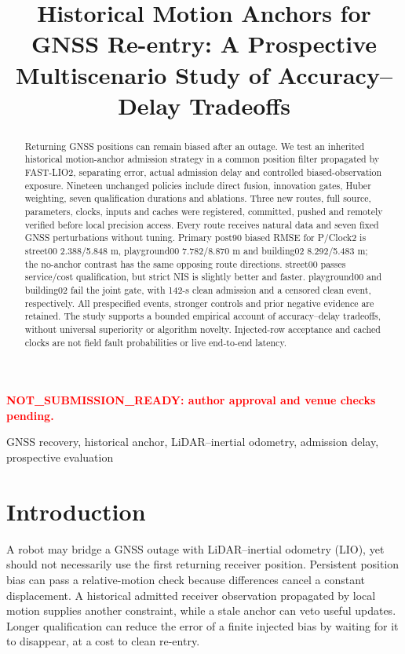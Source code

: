 \documentclass[conference]{IEEEtran}
\title{Historical Motion Anchors for GNSS Re-entry: A Prospective Multiscenario Study of Accuracy--Delay Tradeoffs}
\author{\IEEEauthorblockN{Internal author-review draft: authors and affiliations unassigned}}
\newcommand{\reviewmark}{\textcolor{red}{\textbf{NOT\_SUBMISSION\_READY: author approval and venue checks pending.}}}
\begin{document}
\raggedbottom\maketitle
\begin{center}\small\reviewmark\end{center}
\begin{abstract}
Returning GNSS positions can remain biased after an outage. We test an inherited historical motion-anchor admission strategy in a common position filter propagated by FAST-LIO2, separating error, actual admission delay and controlled biased-observation exposure. Nineteen unchanged policies include direct fusion, innovation gates, Huber weighting, seven qualification durations and ablations. Three new routes, full source, parameters, clocks, inputs and caches were registered, committed, pushed and remotely verified before local precision access. Every route receives natural data and seven fixed GNSS perturbations without tuning. Primary post90 biased RMSE for P/Clock2 is street00 2.388/5.848 m, playground00 7.782/8.870 m and building02 8.292/5.483 m; the no-anchor contrast has the same opposing route directions. street00 passes service/cost qualification, but strict NIS is slightly better and faster. playground00 and building02 fail the joint gate, with 142-s clean admission and a censored clean event, respectively. All prespecified events, stronger controls and prior negative evidence are retained. The study supports a bounded empirical account of accuracy--delay tradeoffs, without universal superiority or algorithm novelty. Injected-row acceptance and cached clocks are not field fault probabilities or live end-to-end latency.
\end{abstract}
\begin{IEEEkeywords}GNSS recovery, historical anchor, LiDAR--inertial odometry, admission delay, prospective evaluation\end{IEEEkeywords}
\section{Introduction}
A robot may bridge a GNSS outage with LiDAR--inertial odometry (LIO), yet should not necessarily use the first returning receiver position. Persistent position bias can pass a relative-motion check because differences cancel a constant displacement. A historical admitted receiver observation propagated by local motion supplies another constraint, while a stale anchor can veto useful updates. Longer qualification can reduce the error of a finite injected bias by waiting for it to disappear, at a cost to clean re-entry.
\end{document}
